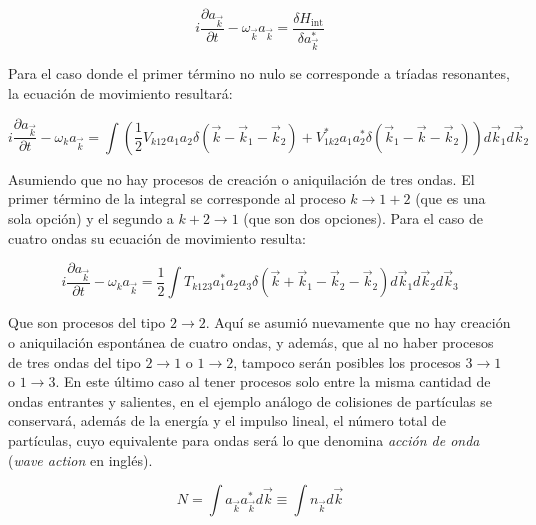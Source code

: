 \begin{equation}
	i\frac{\partial a_{\vec k}}{\partial t}-\omega_{\vec k}a_{\vec k} = \frac{\delta H_{\text{int}}}{\delta a^*_{\vec k}}  %
\end{equation}

Para el caso donde el primer término no nulo se corresponde a tríadas resonantes, la ecuación de movimiento resultará: 

\begin{equation}
	i\frac{\partial a_{\vec k}}{\partial t} - \omega_k a_{\vec k} = \int \left(\frac{1}{2}V_{k12}a_1a_2\delta(\vec k - \vec k_1 -\vec k_2) + V^*_{1k2}a_1a_2^*\delta(\vec k_1 -\vec k-\vec k_2)\right)d\vec k_1d\vec k_2
	\label{eq:motion_equation_three_waves}
\end{equation}

Asumiendo que no hay procesos de creación o aniquilación de tres ondas. El primer término de la integral se corresponde al proceso $k\rightarrow1+2$ (que es una sola opción) y el segundo a $k+2\rightarrow1$ (que son dos opciones). Para el caso de cuatro ondas su ecuación de movimiento resulta: %

\begin{equation}
	i\frac{\partial a_{\vec k}}{\partial t} - \omega_k a_{\vec k} = \frac{1}{2} \int T_{k123}a_1^*a_2a_3\delta(\vec k+\vec k_1-\vec k_2-\vec k_2) d\vec k_1 d\vec k_2d\vec k_3
\end{equation}

Que son procesos del tipo $2\rightarrow2$. Aquí se asumió nuevamente que no hay creación o aniquilación espontánea de cuatro ondas, y además, que al no haber procesos de tres ondas del tipo $2\rightarrow1$ o $1\rightarrow2$, tampoco serán posibles los procesos $3\rightarrow1$ o $1\rightarrow3$. En este último caso al tener procesos solo entre la misma cantidad de ondas entrantes y salientes, en el ejemplo análogo de colisiones de partículas se conservará, además de la energía y el impulso lineal, el número total de partículas, cuyo equivalente para ondas será lo que denomina \textit{acción de onda} (\textit{wave action} en inglés). 

\begin{equation}
	N=\int a_{\vec k}a^*_{\vec k} d\vec k 
	\label{eq:Wave_action_integral} \equiv \int n_{\vec k} d\vec k 
\end{equation}










